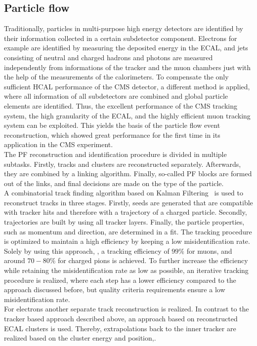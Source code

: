 \subsection{Particle flow}
Traditionally, particles in multi-purpose high energy detectors are identified by their information collected in a certain subdetector component. Electrons for example are identified by measuring the deposited energy in the ECAL, and jets consisting of neutral and charged hadrons and photons are measured independently from informations of the tracker and the muon chambers just with the help of the measurements of the calorimeters. To compensate the only sufficient HCAL performance of the CMS detector, a different method is applied, where all information of all subdetectors are combined and global particle elements are identified. Thus, the excellent performance of the CMS tracking system, the high granularity of the ECAL, and the highly efficient muon tracking system can be exploited. This yields the basis of the particle flow event reconstruction, which showed great performance for the first time in its application in the CMS experiment.\\
The PF reconstruction and identification procedure is divided in multiple subtasks. Firstly, tracks and clusters are reconstructed separately. Afterwards, they are combined by a linking algorithm. Finally, so-called PF blocks are formed out of the links, and final decisions are made on the type of the particle.\\
A combinatorial track finding algorithm based on Kalman Filtering~\cite{Kalman} is used to reconstruct tracks in three stages. Firstly, seeds are generated that are compatible with tracker hits and therefore with a trajectory of a charged particle. Secondly, trajectories are built by using all tracker layers. Finally, the particle properties, such as momentum and direction, are determined in a fit. The tracking procedure is optimized to maintain a high efficiency by keeping a low misidentification rate. Solely by using this approach, \eg, a tracking efficiency of $99\%$ for muons, and around $70-80\%$ for charged pions is achieved. To further increase the efficiency while retaining the misidentification rate as low as possible, an iterative tracking procedure is realized, where each step has a lower efficiency compared to the approach discussed before, but quality criteria requirements ensure a low misidentification rate.\\
For electrons another separate track reconstruction is realized. In contrast to the tracker based approach described above, an approach based on reconstructed ECAL clusters is used. Thereby, extrapolations back to the inner tracker are realized based on the cluster energy and position,.\\
